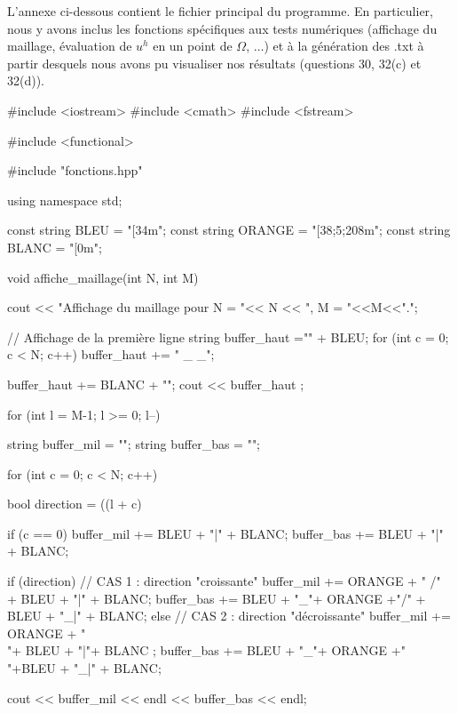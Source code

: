 \label{sec:main}
L'annexe ci-dessous contient le fichier principal du programme. En particulier, nous y avons inclus les fonctions spécifiques aux tests numériques (affichage du maillage, évaluation de $u^h$ en un point de $\Omega$, $\dots$) et à la génération des .txt à partir desquels nous avons pu visualiser nos résultats (questions 30, 32(c) et 32(d)).
\vspace{0.8em}

\begin{codeblock}
#include <iostream>
#include <cmath>
#include <fstream>

#include <functional>

#include "fonctions.hpp"

using namespace std;

const string BLEU  = "[34m";
const string ORANGE = "[38;5;208m";
const string BLANC = "[0m";

void affiche_maillage(int N, int M){

    cout << "Affichage du maillage pour N = "<< N << ", M = "<<M<<".\n";

    // Affichage de la première ligne
    string buffer_haut ="" + BLEU;
    for (int c = 0; c < N; c++) buffer_haut += " _ _";

    buffer_haut += BLANC + "\n";
    cout << buffer_haut ;

    for (int l = M-1; l >= 0; l--){

        string buffer_mil = "";
        string buffer_bas = "";

        for (int c = 0; c < N; c++){

            bool direction = ((l + c) %

            if (c == 0){
                buffer_mil += BLEU + "|" + BLANC;
                buffer_bas += BLEU + "|" + BLANC;
            }

            if (direction){ // CAS 1 : direction "croissante"
                buffer_mil += ORANGE + "  /" + BLEU + "|" + BLANC;
                buffer_bas += BLEU + "_"+ ORANGE +"/" + BLEU + "_|" + BLANC;
            } else {  // CAS 2 : direction "décroissante"
                buffer_mil += ORANGE + "\\  "+ BLEU + "|"+ BLANC ;
                buffer_bas += BLEU + "_"+ ORANGE +"\\"+BLEU + "_|" + BLANC;
            }
       }

        cout << buffer_mil << endl << buffer_bas << endl;
    }

}
\end{codeblock}
